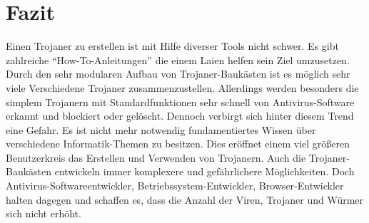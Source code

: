 \section{Fazit}\label{sec:fazit}
Einen Trojaner zu erstellen ist mit Hilfe diverser Tools nicht schwer.
Es gibt zahlreiche \enquote{How-To-Anleitungen} die einem Laien helfen sein Ziel
umzusetzen. Durch den sehr modularen Aufbau von Trojaner-Baukästen ist es
möglich sehr viele Verschiedene Trojaner zusammenzustellen. Allerdings werden 
besonders die simplem Trojanern mit Standardfunktionen sehr schnell von Antivirus-Software 
erkannt und blockiert oder gelöscht. Dennoch verbirgt sich hinter diesem Trend
eine Gefahr. Es ist nicht mehr notwendig fundamentiertes Wissen über verschiedene
Informatik-Themen zu besitzen. Dies eröffnet einem viel größeren Benutzerkreis
das Erstellen und Verwenden von Trojanern. Auch die Trojaner-Baukästen entwickeln
immer komplexere und gefährlichere Möglichkeiten. Doch Antivirus-Softwareentwickler, 
Betriebssystem-Entwickler, Browser-Entwickler halten dagegen und schaffen es, 
dass die Anzahl der Viren, Trojaner und Würmer sich nicht erhöht. 